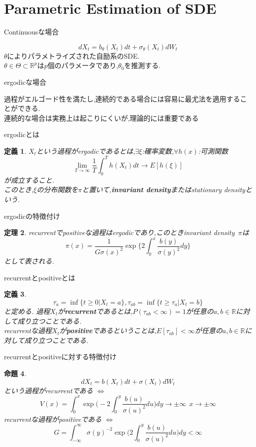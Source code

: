 \documentclass[dvipdfmx,cjk]{beamer}
\numberwithin{equation}{section}
\newtheorem{Thm}     {定理}[section]
\newtheorem{Def}     [Thm]{定義}
\newtheorem{Prop}    [Thm]{命題}
\def\iff{\Leftrightarrow}
\def\R{\mathbb R}
\def\thm{\begin{Thm}}
\def\thmx{\end{Thm}}
\def\prop{\begin{Prop}}
\def\propx{\end{Prop}}
\def\defb{\begin{Def}}
\def\defx{\end{Def}}
\begin{document}
\section{Parametric Estimation of SDE}
\begin{frame}{Continuousな場合}

\[
dX_t = b_\theta (X_t) dt + \sigma_\theta(X_t) dW_t
\]
$\theta$によりパラメトライズされた自励系のSDE.\\
$\theta \in \Theta \subset \R^p$は$p$個のパラメータであり,$\theta_0$を推測する.
\end{frame}

\begin{frame}{ergodicな場合}

過程がエルゴード性を満たし,連続的である場合には容易に最尤法を適用することができる.\\
連続的な場合は実務上は起こりにくいが,理論的には重要である
\end{frame}

\begin{frame}{ergodicとは}
\defb
$X_t$という過程がergodicであるとは,$\exists\xi$:確率変数,$\forall h(x)$:可測関数
\[
\lim_{T\to \infty} \frac{1}{T} \int_0^T h(X_t) dt  \to E[h(\xi)]
\]
が成立すること.\\
このとき,$\xi$の分布関数を$\pi$と置いて,{\bf invariant density}またはstationary densityという.
\defx
\end{frame}
\begin{frame}{ergodicの特徴付け}

\thm
recurrentでpositiveな過程はergodicであり,このときinvariant density\ $\pi$は
\[
\pi(x) = \frac{1}{G\sigma(x)^2} 
	\exp 
	\biggl\{ 
		2 \int_0^x \frac{b(y)}{\sigma(y)^2}dy 
	\biggl\}
\]
として表される.
\thmx
\end{frame}

\begin{frame}{recurrentとpositiveとは}
\defb
\[
\tau_a = \inf \{ t\ge 0 |X_t =a \} , \tau_{ab} = \inf \{ t \ge \tau_a | X_t =b \}
\]
と定める.
過程$X_t$が{\bf recurrent}であるとは,$P(\tau_{ab} < \infty) =1$が任意の$a,b\in\R$に対して成り立つことである.\\
recurrentな過程$X_t$が{\bf positive}であるということは,$E[\tau_{ab}] < \infty$が任意の$a,b\in\R$に対して成り立つことである.\\
\defx
\end{frame}

\begin{frame}{recurrentとpositiveに対する特徴付け}
\prop
\[
dX_t = b (X_t) dt + \sigma (X_t) dW_t
\]
という過程がrecurrentである $\iff$
\[
V(x) = \int_{0}^x \exp \biggl( -2 \int_{0}^y \frac{b(u)}{\sigma(u)^2} du \biggl) dy   \to \pm\infty \ \ x\to \pm\infty
\]
recurrentな過程がpositiveである $\iff$
\[
G= \int_{-\infty}^\infty \sigma(y)^{-2} \exp \biggl( 2 \int_{0}^y \frac{b(u)}{\sigma(u)^2} du \biggl) dy  < \infty
\]
\propx
\end{frame}
\end{document}
